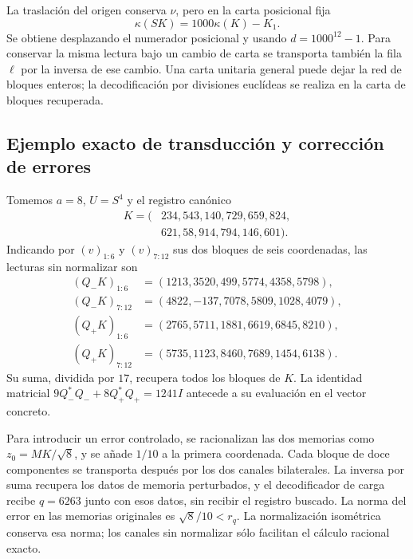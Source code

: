 La traslación del origen conserva \(\nu\), pero en la carta
posicional fija
\begin{equation}
 \kappa(SK)=1000\kappa(K)-K_1.
 \label{lib04:cambio-origen}
\end{equation}
Se obtiene desplazando el numerador posicional y usando
\(d=1000^{12}-1\). Para conservar la misma lectura bajo un cambio
de carta se transporta también la fila \(\ell\) por la inversa
de ese cambio. Una carta unitaria general puede dejar la red de
bloques enteros; la decodificación por divisiones euclídeas se realiza
en la carta de bloques recuperada.

\subsection{Ejemplo exacto de transducción y corrección de errores}
\label{lib04:ejemplo}

Tomemos \(a=8\), \(U=S^4\) y el registro canónico
\begin{equation}
 \begin{split}
 K=(&234,543,140,729,659,824,\\
    &621,58,914,794,146,601).
 \end{split}
 \label{lib04:k-ejemplo}
\end{equation}
Indicando por \((v)_{1:6}\) y \((v)_{7:12}\) sus dos bloques de
seis coordenadas, las lecturas sin normalizar son
\begin{align}
 (Q_-K)_{1:6}&=(1213,3520,499,5774,4358,5798),\nonumber\\
 (Q_-K)_{7:12}&=(4822,-137,7078,5809,1028,4079),\nonumber\\
 (Q_+K)_{1:6}&=(2765,5711,1881,6619,6845,8210),\nonumber\\
 (Q_+K)_{7:12}&=(5735,1123,8460,7689,1454,6138).
 \label{lib04:canales-ejemplo}
\end{align}
Su suma, dividida por \(17\), recupera todos los bloques de \(K\).
La identidad matricial
\(9Q_-^*Q_-+8Q_+^*Q_+=1241I\) antecede a su evaluación en el
vector concreto.

Para introducir un error controlado, se racionalizan las dos memorias
como \(z_0=MK/\sqrt8\), y se añade \(1/10\) a la primera
coordenada. Cada bloque de doce componentes se transporta después
por los dos canales bilaterales. La inversa por suma recupera los
datos de memoria perturbados, y el decodificador de carga recibe
\(q=6263\) junto con esos datos, sin recibir el registro buscado.
La norma del error en las memorias originales es
\(\sqrt8/10<r_q\). La normalización isométrica conserva esa norma;
los canales sin normalizar sólo facilitan el cálculo racional exacto.

